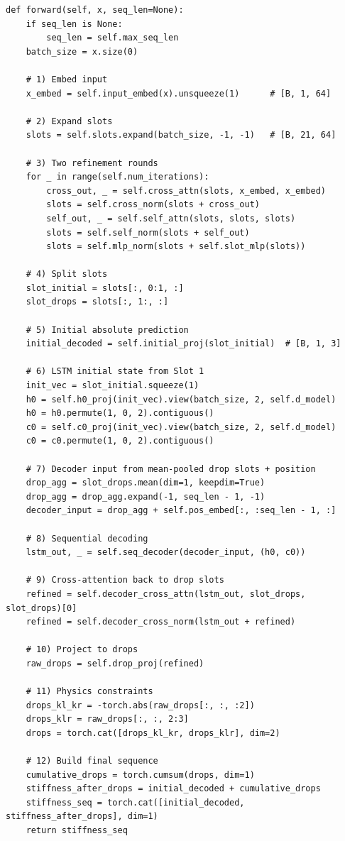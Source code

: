 \documentclass[11pt,a4paper]{article}
\begin{document}
\begin{lstlisting}
def forward(self, x, seq_len=None):
    if seq_len is None:
        seq_len = self.max_seq_len
    batch_size = x.size(0)

    # 1) Embed input
    x_embed = self.input_embed(x).unsqueeze(1)      # [B, 1, 64]

    # 2) Expand slots
    slots = self.slots.expand(batch_size, -1, -1)   # [B, 21, 64]

    # 3) Two refinement rounds
    for _ in range(self.num_iterations):
        cross_out, _ = self.cross_attn(slots, x_embed, x_embed)
        slots = self.cross_norm(slots + cross_out)
        self_out, _ = self.self_attn(slots, slots, slots)
        slots = self.self_norm(slots + self_out)
        slots = self.mlp_norm(slots + self.slot_mlp(slots))

    # 4) Split slots
    slot_initial = slots[:, 0:1, :]
    slot_drops = slots[:, 1:, :]

    # 5) Initial absolute prediction
    initial_decoded = self.initial_proj(slot_initial)  # [B, 1, 3]

    # 6) LSTM initial state from Slot 1
    init_vec = slot_initial.squeeze(1)
    h0 = self.h0_proj(init_vec).view(batch_size, 2, self.d_model)
    h0 = h0.permute(1, 0, 2).contiguous()
    c0 = self.c0_proj(init_vec).view(batch_size, 2, self.d_model)
    c0 = c0.permute(1, 0, 2).contiguous()

    # 7) Decoder input from mean-pooled drop slots + position
    drop_agg = slot_drops.mean(dim=1, keepdim=True)
    drop_agg = drop_agg.expand(-1, seq_len - 1, -1)
    decoder_input = drop_agg + self.pos_embed[:, :seq_len - 1, :]

    # 8) Sequential decoding
    lstm_out, _ = self.seq_decoder(decoder_input, (h0, c0))

    # 9) Cross-attention back to drop slots
    refined = self.decoder_cross_attn(lstm_out, slot_drops, slot_drops)[0]
    refined = self.decoder_cross_norm(lstm_out + refined)

    # 10) Project to drops
    raw_drops = self.drop_proj(refined)

    # 11) Physics constraints
    drops_kl_kr = -torch.abs(raw_drops[:, :, :2])
    drops_klr = raw_drops[:, :, 2:3]
    drops = torch.cat([drops_kl_kr, drops_klr], dim=2)

    # 12) Build final sequence
    cumulative_drops = torch.cumsum(drops, dim=1)
    stiffness_after_drops = initial_decoded + cumulative_drops
    stiffness_seq = torch.cat([initial_decoded, stiffness_after_drops], dim=1)
    return stiffness_seq
\end{lstlisting}
\end{document}
